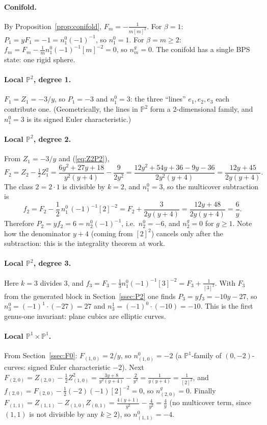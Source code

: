 \documentclass[11pt]{article}
\theoremstyle{plain}
\theoremstyle{definition}
\theoremstyle{remark}
\newcommand{\PP}{\mathbb{P}}
\begin{document}
\paragraph{Conifold.} By Proposition~\ref{prop:conifold}, $F_m=-\frac1{m[m]^2}$. For $\beta=1$:
$P_1=yF_1=-1=n^0_1(-1)^{-1}$, so $n^0_1=1$. For $\beta=m\ge2$: $f_m=F_m-\frac1m n^0_1(-1)^{-1}[m]^{-2}=0$,
so $n^g_m=0$. The conifold has a single BPS state: one rigid sphere.

\paragraph{Local $\PP^2$, degree 1.} $F_1=Z_1=-3/y$, so $P_1=-3$ and $n^0_1=3$: the three
``lines'' $e_1,e_2,e_3$ each contribute one. (Geometrically, the lines in $\PP^2$ form a
2-dimensional family, and $n^0_1=3$ is its signed Euler characteristic.)

\paragraph{Local $\PP^2$, degree 2.} From $Z_1=-3/y$ and (\ref{eq:Z2P2}),
\begin{equation}
F_2=Z_2-\tfrac12Z_1^2=\frac{6y^2+27y+18}{y^2(y+4)}-\frac{9}{2y^2}
=\frac{12y^2+54y+36-9y-36}{2y^2(y+4)}=\frac{12y+45}{2y(y+4)} .
\end{equation}
The class $2=2\cdot1$ is divisible by $k=2$, and $n^0_1=3$, so the multicover subtraction is
\begin{equation}
f_2=F_2-\frac12\,n^0_1\,(-1)^{-1}[2]^{-2}=F_2+\frac{3}{2y(y+4)}=\frac{12y+48}{2y(y+4)}=\frac6y .
\end{equation}
Therefore $P_2=y f_2=6=n^0_2(-1)^{-1}$, i.e.\ $n^0_2=-6$, and $n^g_2=0$ for $g\ge1$. Note how the
denominator $y+4$ (coming from $[2]^2$) cancels only after the subtraction: this is the
integrality theorem at work.

\paragraph{Local $\PP^2$, degree 3.} Here $k=3$ divides $3$, and $f_3=F_3-\frac13n^0_1(-1)^{-1}[3]^{-2}
=F_3+\frac1{[3]^2}$. With $F_3$ from the generated block in Section~\ref{ssec:P2} one finds
$P_3=yf_3=-10y-27$, so $n^0_3=(-1)^{1}\cdot(-27)=27$ and $n^1_3=(-1)^0\cdot(-10)=-10$. This is the
first genus-one invariant: plane cubics are elliptic curves.

\paragraph{Local $\PP^1\times\PP^1$.} From Section~\ref{ssec:F0}: $F_{(1,0)}=2/y$, so $n^0_{(1,0)}=-2$
(a $\PP^1$-family of $(0,-2)$-curves: signed Euler characteristic $-2$). Next
$F_{(2,0)}=Z_{(2,0)}-\frac12Z_{(1,0)}^2=\frac{3y+8}{y^2(y+4)}-\frac2{y^2}=\frac{1}{y(y+4)}=\frac1{[2]^2}$,
and $f_{(2,0)}=F_{(2,0)}-\frac12(-2)(-1)[2]^{-2}=0$, so $n^g_{(2,0)}=0$. Finally
$F_{(1,1)}=Z_{(1,1)}-Z_{(1,0)}Z_{(0,1)}=\frac{4(y+1)}{y^2}-\frac4{y^2}=\frac4y$ (no multicover term,
since $(1,1)$ is not divisible by any $k\ge2$), so $n^0_{(1,1)}=-4$.
\end{document}
